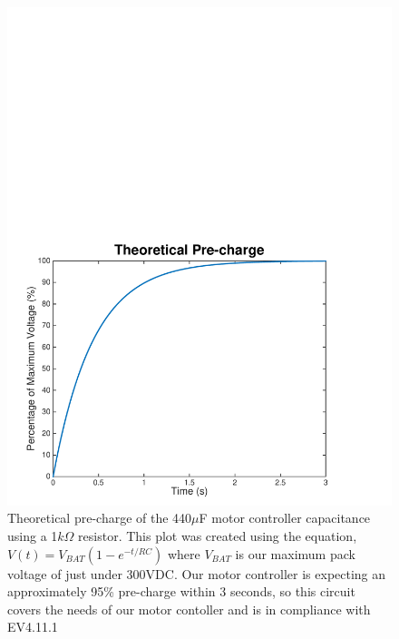 \documentclass{article}
\begin{document}
\begin{figure}[H]
    \centering
    \includegraphics[width = 0.8 \textwidth]{precharge_voltage}
    \caption{Theoretical pre-charge of the 440$\mu$F motor controller capacitance using a 1$k\Omega$ resistor. This plot was created using the equation, $V(t) = V_{BAT}(1 - e^{-t/RC})$ where $V_{BAT}$ is our maximum pack voltage of just under 300VDC. Our motor controller is expecting an approximately 95\% pre-charge within 3 seconds, so this circuit covers the needs of our motor contoller and is in compliance with EV4.11.1 }
    \label{precharge_voltage}
\end{figure}
\end{document}
